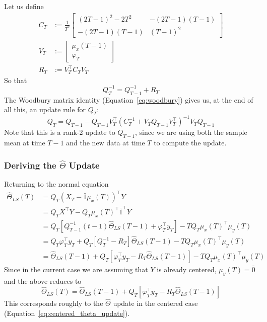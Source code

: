 Let us define
\begin{align}
  C_T &:= \frac{1}{T^2}
  \begin{bmatrix}
    (2T - 1)^2 - 2T^2 & -(2T - 1)(T - 1) \\
    -(2T - 1)(T - 1) & (T - 1)^2
  \end{bmatrix} \\
  V_T &:= 
  \begin{bmatrix}
    \mu_x(T - 1) \\
    \varphi_T
  \end{bmatrix} \\
  R_T &:= V_T^\top C_T V_T
\end{align}
So that 
\begin{equation}
  \label{eq:Q_T_inv}
  Q_T^{-1} = Q_{T - 1}^{-1} + R_T
\end{equation}
The Woodbury matrix identity (Equation~\ref{eq:woodbury}) gives us, at the end
of all this, an update rule for $Q_T$:
\begin{equation}
  Q_T = Q_{T - 1} - Q_{T - 1}V_T^\top\left(C_T^{-1} + V_TQ_{T-1}V_T^\top\right)^{-1}V_TQ_{T-1}
\end{equation}
Note that this is a rank-2 update to $Q_{T-1}$, since we are using both the
sample mean at time $T - 1$ and the new data at time $T$ to compute the update.

\subsubsection{Deriving the $\hat\Theta$ Update}
Returning to the normal equation
\begin{align}
  \hat\Theta_{LS}(T) &= Q_T (X_T - \bar{1} \mu_x(T))^\top Y \\
                     &= Q_TX^\top Y - Q_T \mu_x(T)^\top\bar{1}^\top Y \\
                     &= Q_T\left[Q_{T-1}^{-1}(t-1)\hat\Theta_{LS}(T-1) + \varphi_T^\top y_T\right] - TQ_T\mu_x(T)^\top \mu_y(T) \\
                     &= Q_T \varphi_T^\top y_T + Q_T\left[Q_{T}^{-1} - R_T\right]\hat\Theta_{LS}(T-1) - TQ_T\mu_x(T)^\top\mu_y(T) \\
                     &= \hat\Theta_{LS}(T-1) + Q_T\left[\varphi_T^\top y_T - R_T\hat\Theta_{LS}(T-1)\right] - TQ_T\mu_x(T)^\top \mu_y(T) \label{eq:uncentered_x_theta_with_correction}
\end{align}
Since in the current case we are assuming that $Y$ is already centered,
$\mu_y(T) = \bar{0}$ and the above reduces to
\begin{equation}
  \hat\Theta_{LS}(T) = \hat\Theta_{LS}(T-1) + Q_T\left[\varphi_T^\top y_T - R_T\hat\Theta_{LS}(T-1)\right] \label{eq:uncentered_x_theta_update}
\end{equation}
This corresponds roughly to the $\hat\Theta$ update in the centered case (Equation~\ref{eq:centered_theta_update}).

